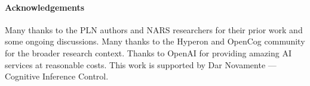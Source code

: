 \documentclass{easychair}
\begin{document}
\vspace{-3mm}
\paragraph*{Acknowledgements}
Many thanks to the PLN authors and NARS researchers for their prior work and some ongoing discussions.
Many thanks to the Hyperon and OpenCog community for the broader research context.
Thanks to OpenAI for providing amazing AI services at reasonable costs.
This work is supported by Dar Novamente --- Cognitive Inference Control.



\newpage
\vspace{-3mm}


\end{document}
